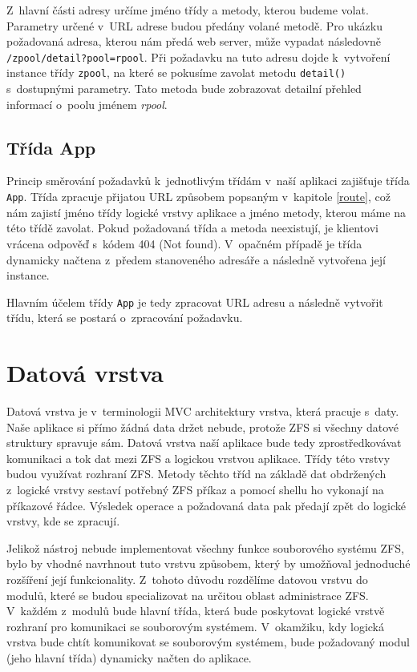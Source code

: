 Z~hlavní části adresy určíme jméno třídy a metody, kterou budeme volat. Parametry určené v~URL adrese budou předány volané metodě. Pro ukázku požadovaná adresa, kterou nám předá web server, může vypadat následovně \verb|/zpool/detail?pool=rpool|.
Při požadavku na tuto adresu dojde k~vytvoření instance třídy \verb|zpool|, na které se pokusíme zavolat metodu \verb|detail()| s~dostupnými parametry. Tato metoda bude zobrazovat detailní přehled informací o~poolu jménem \emph{rpool}.
    \subsection{Třída App}
    Princip směrování požadavků k~jednotlivým třídám v~naší aplikaci zajišťuje třída \verb|App|. Třída zpracuje přijatou URL způsobem popsaným v~kapitole \ref{route}, což nám zajistí jméno třídy logické vrstvy aplikace a jméno metody, kterou máme na této třídě zavolat. Pokud požadovaná třída a metoda neexistují, je klientovi vrácena odpověď s~kódem 404 (Not found). V~opačném případě je třída dynamicky načtena z~předem stanoveného adresáře a následně vytvořena její instance.

    Hlavním účelem třídy \verb|App| je tedy zpracovat URL adresu a následně vytvořit třídu, která se postará o~zpracování požadavku.

\section{Datová vrstva}
Datová vrstva je v~terminologii MVC architektury vrstva, která pracuje s~daty. Naše aplikace si přímo žádná data držet nebude, protože ZFS si všechny datové struktury spravuje sám. Datová vrstva naší aplikace bude tedy zprostředkovávat komunikaci a tok dat mezi ZFS a logickou vrstvou aplikace. Třídy této vrstvy budou využívat rozhraní ZFS. Metody těchto tříd na základě dat obdržených z~logické vrstvy sestaví potřebný ZFS příkaz a pomocí shellu ho vykonají na příkazové řádce. Výsledek operace a požadovaná data pak předají zpět do logické vrstvy, kde se zpracují.

Jelikož nástroj nebude implementovat všechny funkce souborového systému ZFS, bylo by vhodné navrhnout tuto vrstvu způsobem, který by umožňoval jednoduché rozšíření její funkcionality.
Z~tohoto důvodu rozdělíme datovou vrstvu do modulů, které se budou specializovat na určitou oblast administrace ZFS. V~každém z~modulů bude hlavní třída, která bude poskytovat logické vrstvě rozhraní pro komunikaci se souborovým systémem. V~okamžiku, kdy logická vrstva bude chtít komunikovat se souborovým systémem, bude požadovaný modul (jeho hlavní třída) dynamicky načten do aplikace.
